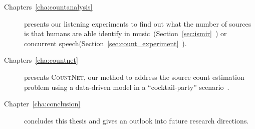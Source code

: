\begin{description}
  \item[Chapters~\ref{cha:countanalysis}] presents our listening experiments to find out what the number of sources is that humans are able identify in music~(Section~\ref{sec:ismir}~\cite{schoeffler13, stoeter13}) or concurrent speech(Section~\ref{sec:count_experiment}~\cite{stoeter19, stoeter18}). 
  \item[Chapters~\ref{cha:countnet}] presents \textsc{CountNet}, our method to address the source count estimation problem using a data-driven model in a ``cocktail-party'' scenario~\cite{stoeter19}.
  \item[Chapter~\ref{cha:conclusion}] concludes this thesis and gives an outlook into future research directions.
\end{description}
